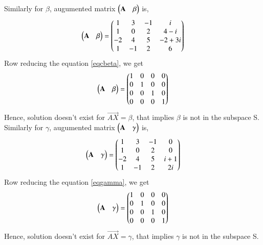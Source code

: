 \documentclass[journal,12pt,twocolumn]{IEEEtran}
\begin{document}
 Similarly for $\beta$, augumented matrix $\begin{pmatrix}\mathbf{A}&\beta\end{pmatrix}$ is,
\begin{align}\label{eqcbeta}
\begin{pmatrix}\mathbf{A}&\beta\end{pmatrix}=\begin{pmatrix}1&3&-1&i\\1&0&2&4-i\\-2&4&5&-2+3i\\1&-1&2&6\end{pmatrix} 
\end{align}
Row reducing the equation \eqref{eqcbeta}, we get
\begin{align}
\begin{pmatrix}\mathbf{A}&\beta\end{pmatrix}= \begin{pmatrix}1&0&0&0\\0&1&0&0\\0&0&1&0\\0&0&0&1\end{pmatrix}
\end{align}
Hence, solution doesn't exist for $\vec{AX}=\beta$, that implies $\beta$ is not in the subspace S.\\
Similarly for $\gamma$, augumented matrix $\begin{pmatrix}\mathbf{A}&\gamma\end{pmatrix}$ is,
\begin{align}\label{eqgamma}
\begin{pmatrix}\mathbf{A}&\gamma\end{pmatrix}=\begin{pmatrix}1&3&-1&0\\1&0&2&0\\-2&4&5&i+1\\1&-1&2&2i\end{pmatrix} 
\end{align}
Row reducing the equation \eqref{eqgamma}, we get
\begin{align}
\begin{pmatrix}\mathbf{A}&\gamma\end{pmatrix}= \begin{pmatrix}1&0&0&0\\0&1&0&0\\0&0&1&0\\0&0&0&1\end{pmatrix}
\end{align}
Hence, solution doesn't exist for $\vec{AX}=\gamma$, that implies $\gamma$ is not in the subspace S.
\end{document}
